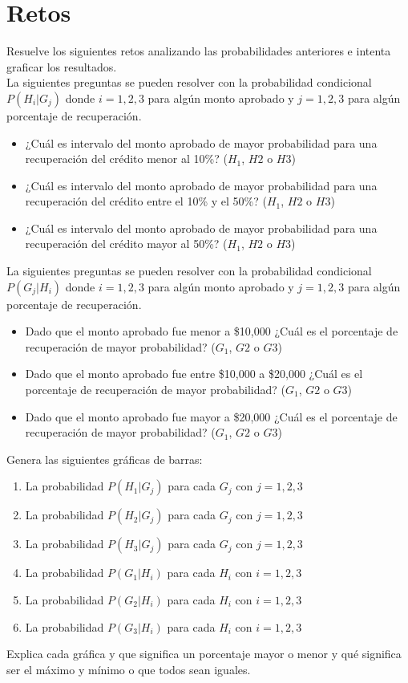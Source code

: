 \documentclass{article}
\begin{document}
\section{Retos}

Resuelve los siguientes retos analizando las probabilidades anteriores e intenta graficar los resultados.
\\[12pt]
La siguientes preguntas se pueden resolver con la probabilidad condicional $P(H_i|G_j)$ donde $i=1,2,3$ para algún monto aprobado y $j=1,2,3$ para algún porcentaje de recuperación.
\begin{itemize}
    \item ¿Cuál es intervalo del monto aprobado de mayor probabilidad para una recuperación del crédito menor al 10\%? ($H_1$, $H2$ o $H3$)
    \item ¿Cuál es intervalo del monto aprobado de mayor probabilidad para una recuperación del crédito entre el 10\% y el 50\%? ($H_1$, $H2$ o $H3$)
    \item ¿Cuál es intervalo del monto aprobado de mayor probabilidad para una recuperación del crédito mayor al 50\%? ($H_1$, $H2$ o $H3$)
\end{itemize}
La siguientes preguntas se pueden resolver con la probabilidad condicional $P(G_j|H_i)$ donde $i=1,2,3$ para algún monto aprobado y $j=1,2,3$ para algún porcentaje de recuperación.
\begin{itemize}
    \item Dado que el monto aprobado fue menor a \$10,000 ¿Cuál es el porcentaje de recuperación de mayor probabilidad? ($G_1$, $G2$ o $G3$)
    \item Dado que el monto aprobado fue entre \$10,000 a \$20,000 ¿Cuál es el porcentaje de recuperación de mayor probabilidad? ($G_1$, $G2$ o $G3$)
    \item Dado que el monto aprobado fue mayor a \$20,000 ¿Cuál es el porcentaje de recuperación de mayor probabilidad? ($G_1$, $G2$ o $G3$)
\end{itemize}
Genera las siguientes gráficas de barras:
\begin{enumerate}
    \item La probabilidad $P(H_1 | G_j)$ para cada $G_j$ con $j=1,2,3$
    \item La probabilidad $P(H_2 | G_j)$ para cada $G_j$ con $j=1,2,3$
    \item La probabilidad $P(H_3 | G_j)$ para cada $G_j$ con $j=1,2,3$
    \item La probabilidad $P(G_1 | H_i)$ para cada $H_i$ con $i=1,2,3$
    \item La probabilidad $P(G_2 | H_i)$ para cada $H_i$ con $i=1,2,3$
    \item La probabilidad $P(G_3 | H_i)$ para cada $H_i$ con $i=1,2,3$
\end{enumerate}
Explica cada gráfica y que significa un porcentaje mayor o menor y qué significa ser el máximo y mínimo o que todos sean iguales.
\end{document}
